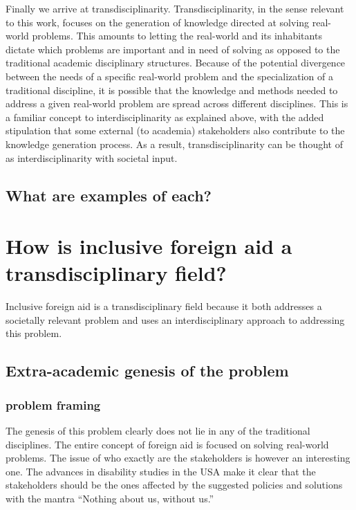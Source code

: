 \documentclass{lps}
\begin{document}
Finally we arrive at transdisciplinarity. Transdisciplinarity, in the sense
relevant to this work, focuses on the generation of knowledge directed at
solving real-world problems. This amounts to letting the real-world and its
inhabitants dictate which problems are important and in need of solving as
opposed to the traditional academic disciplinary structures. Because of the
potential divergence between the needs of a specific real-world problem and
the specialization of a traditional discipline, it is possible that the
knowledge and methods needed to address a given real-world problem are spread
across different disciplines. This is a familiar concept to
interdisciplinarity as explained above, with the added stipulation that some
external (to academia) stakeholders also contribute to the knowledge
generation process. As a result, transdisciplinarity can be thought of as
interdisciplinarity with societal input. 

\subsection{What are examples of each?}

\section{How is inclusive foreign aid a transdisciplinary field?}

Inclusive foreign aid is a transdisciplinary field because it both addresses a
societally relevant problem and uses an interdisciplinary approach to
addressing this problem. 

\subsection{Extra-academic genesis of the problem}

\subsubsection{problem framing}

The genesis of this problem clearly does not lie in any of the traditional
disciplines. The entire concept of foreign aid is focused on solving
real-world problems. The issue of who exactly are the stakeholders is however
an interesting one. The advances in disability studies in the USA make it
clear that the stakeholders should be the ones affected by the suggested
policies and solutions with the mantra “Nothing about us, without us.” 
\end{document}

